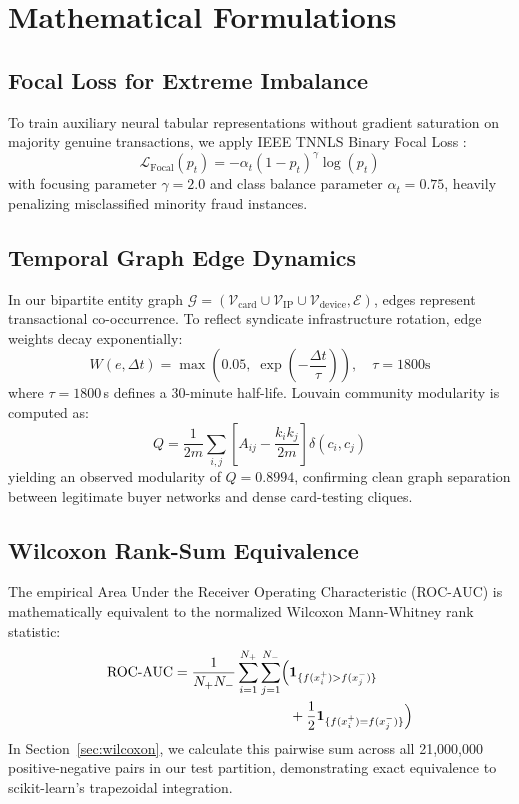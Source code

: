 \documentclass[conference]{IEEEtran}
\begin{document}
\section{Mathematical Formulations}
\label{sec:math}

\subsection{Focal Loss for Extreme Imbalance}
To train auxiliary neural tabular representations without gradient saturation on majority genuine transactions, we apply IEEE TNNLS Binary Focal Loss \cite{lin2017focal}:
\begin{equation}
    \mathcal{L}_{\text{Focal}}(p_t) = -\alpha_t (1 - p_t)^\gamma \log(p_t)
\end{equation}
with focusing parameter $\gamma = 2.0$ and class balance parameter $\alpha_t = 0.75$, heavily penalizing misclassified minority fraud instances.

\subsection{Temporal Graph Edge Dynamics}
In our bipartite entity graph $\mathcal{G} = (\mathcal{V}_{\text{card}} \cup \mathcal{V}_{\text{IP}} \cup \mathcal{V}_{\text{device}}, \mathcal{E})$, edges represent transactional co-occurrence. To reflect syndicate infrastructure rotation, edge weights decay exponentially:
\begin{equation}
    W(e, \Delta t) = \max\left(0.05, \; \exp\left(-\frac{\Delta t}{\tau}\right)\right), \quad \tau = 1800\text{s}
    \label{eq:decay_math}
\end{equation}
where $\tau = 1800$\,s defines a 30-minute half-life. Louvain community modularity is computed as:
\begin{equation}
    Q = \frac{1}{2m} \sum_{i,j} \left[ A_{ij} - \frac{k_i k_j}{2m} \right] \delta(c_i, c_j)
\end{equation}
yielding an observed modularity of $Q = 0.8994$, confirming clean graph separation between legitimate buyer networks and dense card-testing cliques.

\subsection{Wilcoxon Rank-Sum Equivalence}
The empirical Area Under the Receiver Operating Characteristic (ROC-AUC) is mathematically equivalent to the normalized Wilcoxon Mann-Whitney rank statistic:
\begin{align}
    \text{ROC-AUC} = \frac{1}{N_+ N_-} \sum_{i=1}^{N_+} \sum_{j=1}^{N_-} \Bigl( &\mathbf{1}_{\{f(x_i^+) > f(x_j^-)\}} \nonumber \\
    &+ \frac{1}{2}\mathbf{1}_{\{f(x_i^+) = f(x_j^-)\}} \Bigr)
    \label{eq:wilcoxon_math}
\end{align}
In Section~\ref{sec:wilcoxon}, we calculate this pairwise sum across all 21,000,000 positive-negative pairs in our test partition, demonstrating exact equivalence to scikit-learn's trapezoidal integration.
\end{document}

